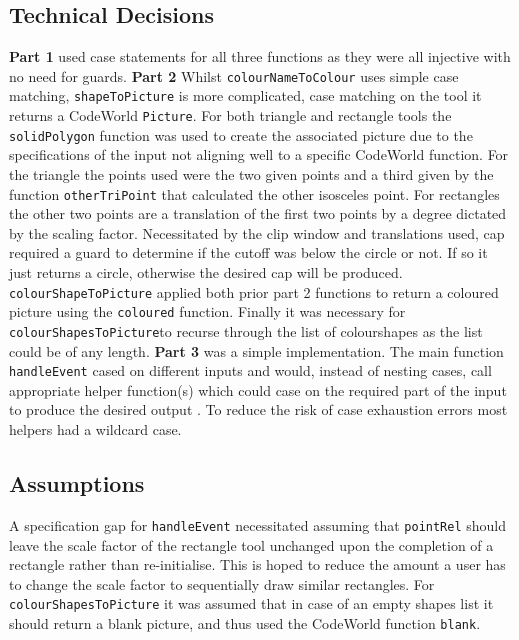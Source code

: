 \documentclass[11pt]{article}
\begin{document}
\subsection{Technical Decisions}
\textbf{Part 1} used case statements for all three functions as they were all injective with no need for guards.
 \textbf{Part 2} Whilst \verb|colourNameToColour| uses simple case matching, \verb|shapeToPicture| is more complicated, case matching on the tool it returns a CodeWorld \verb|Picture|. For both triangle and rectangle tools the \verb|solidPolygon| function was used to create the associated picture due to the specifications of the input not aligning well to a specific CodeWorld function. For the triangle the points used were the two given points and a third given by the function \verb|otherTriPoint| that calculated the other isosceles point. For rectangles the other two points are a translation of the first two points by a degree dictated by the scaling factor. Necessitated by the clip window and translations used, cap required a guard to determine if the cutoff was below the circle or not. If so it just returns a circle, otherwise the desired cap will be produced. \verb|colourShapeToPicture| applied both prior part 2 functions to return a coloured picture using the \verb|coloured| function. Finally it was necessary for  \verb|colourShapesToPicture|to recurse through the list of colourshapes as the list could be of any length.
 \textbf{Part 3} was a simple implementation. The main function \verb|handleEvent| cased on different inputs and would, instead of nesting cases, call appropriate helper function(s) which could case on the required part of the input to produce the desired output .  To reduce the risk of case exhaustion errors most helpers had a wildcard case.

 \subsection{Assumptions}%
A specification gap for \verb|handleEvent| necessitated assuming that \verb|pointRel| should leave the scale factor of the rectangle tool unchanged upon the completion of a rectangle rather than re-initialise. This is hoped to reduce the amount a user has to change the scale factor to sequentially draw similar rectangles. For \verb|colourShapesToPicture| it was assumed that in case of an empty shapes list it should return a blank picture, and thus used the CodeWorld function \verb|blank|.
\end{document}
